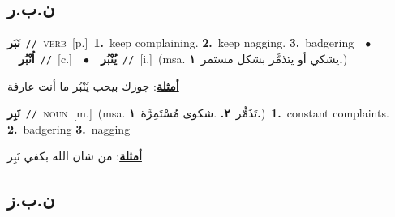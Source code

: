 \documentclass[10pt,a4paper,twoside]{article} %
\begin{document}
\begin{multicols}{2}
\vspace{-3mm}
\subsection*{\color{blue}\foreignlanguage{arabic}{ن.ب.ر}\color{blue}{}} 

{\setlength\topsep{0pt}\textbf{\foreignlanguage{arabic}{نَبَر}}\ {\color{gray}\texttt{//}\color{black}}\ \textsc{verb}\ [p.]\ \textbf{1.}~keep complaining.  \textbf{2.}~keep nagging.  \textbf{3.}~badgering\ \ $\bullet$\ \ \setlength\topsep{0pt}\textbf{\foreignlanguage{arabic}{اُنْبُر}}\ {\color{gray}\texttt{//}\color{black}}\ [c.]\ \ $\bullet$\ \ \setlength\topsep{0pt}\textbf{\foreignlanguage{arabic}{يُنْبُر}}\ {\color{gray}\texttt{//}\color{black}}\ [i.]\ \color{gray}(msa. \foreignlanguage{arabic}{يشكي أو يتذمَّر بشكل مستمر}~\foreignlanguage{arabic}{\textbf{١.}})\color{black}\  \begin{flushright}\color{gray}\foreignlanguage{arabic}{\textbf{\underline{\foreignlanguage{arabic}{أمثلة}}}: جوزك بيحب يُنْبُر ما أنت عارفة}\end{flushright}\color{black}} \vspace{2mm}

{\setlength\topsep{0pt}\textbf{\foreignlanguage{arabic}{نَبِر}}\ {\color{gray}\texttt{//}\color{black}}\ \textsc{noun}\ [m.]\ \color{gray}(msa. \foreignlanguage{arabic}{تَذَمُّر}~\foreignlanguage{arabic}{\textbf{٢.}}  .\foreignlanguage{arabic}{شكوى مُسْتَمِرَّة}~\foreignlanguage{arabic}{\textbf{١.}})\color{black}\ \textbf{1.}~constant complaints.  \textbf{2.}~badgering  \textbf{3.}~nagging\  \begin{flushright}\color{gray}\foreignlanguage{arabic}{\textbf{\underline{\foreignlanguage{arabic}{أمثلة}}}: من شان الله بكفي نَبِر}\end{flushright}\color{black}} \vspace{2mm}

\vspace{-3mm}
\subsection*{\color{blue}\foreignlanguage{arabic}{ن.ب.ز}\color{blue}{}} 


\end{multicols}
\end{document}
